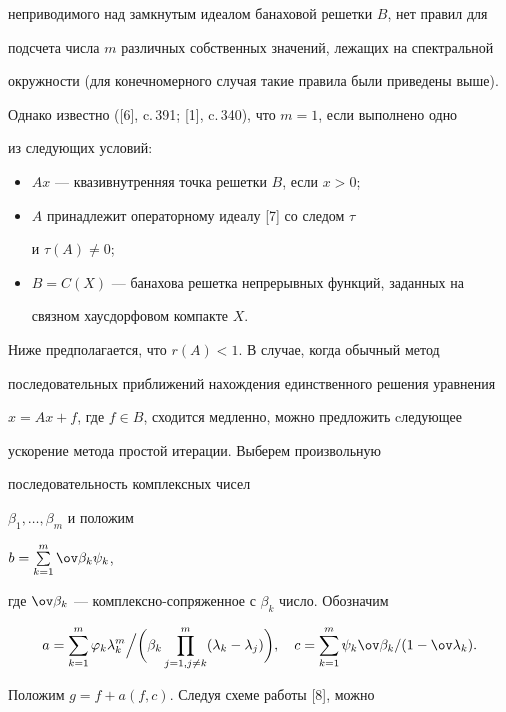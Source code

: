 неприводимого над замкнутым идеалом банаховой решетки $B$, нет правил для


подсчета числа $m$ различных собственных значений, лежащих на спектральной


окружности (для конечномерного случая такие правила были приведены выше).


Однако известно ([6], c.\,391; [1], c.\,340), что $m = 1$, если выполнено одно


из следующих условий:


\begin{itemize}


\item[а)] $Ax$ --- квазивнутренняя точка решетки $B$, если $x > 0$;


\item[б)] $A$ принадлежит операторному идеалу [7] со следом $\tau$


и $\tau(A) \ne 0$;


\item[в)] $B = C(X)$ --- банахова решетка непрерывных функций, заданных на 


связном хаусдорфовом компакте $X$.


\end{itemize}





Ниже предполагается, что $r(A) < 1$. В случае, когда обычный метод 


последовательных приближений нахождения единственного решения уравнения 


$x = Ax + f$, где $f\in B$, сходится медленно, можно предложить cледующее


ускорение метода простой итерации. Выберем произвольную 


последовательность комплексных чисел 


$\beta_1,\dotsc,\beta_m$ и положим 


$b = \sum\limits_{k=1}^m \ov\beta_k\psi_k$, 


где $\ov\beta_k$ --- комплексно-сопряженное с $\beta_k$ число. Обозначим


$$


a = \sum_{k=1}^m \varphi_k\lambda_k^m \Big/


\bigg(\beta_k\prod_{j=1,j\ne k}^m (\lambda_k - \lambda_j)\bigg),\quad


c = \sum_{k=1}^m \psi_k \ov\beta_k/(1 - \ov\lambda_k).


$$


Положим $g = f + a(f,c)$. Следуя схеме работы [8], можно


